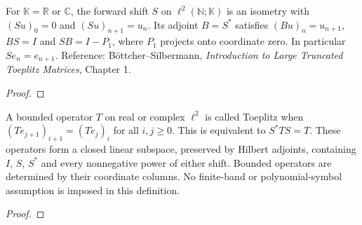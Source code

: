 \begin{supporting}
\begin{theorem}
\label{thm:toeplitz-shifts}
\leanok
For $\mathbb K=\mathbb R$ or $\mathbb C$, the forward shift $S$ on
$\ell^2(\mathbb N;\mathbb K)$ is an isometry with $(Su)_0=0$ and
$(Su)_{n+1}=u_n$. Its adjoint $B=S^*$ satisfies $(Bu)_n=u_{n+1}$,
$BS=I$ and $SB=I-P_1$, where $P_1$ projects onto coordinate zero.
In particular $Se_n=e_{n+1}$.
Reference: Böttcher--Silbermann, \emph{Introduction to Large Truncated
Toeplitz Matrices}, Chapter 1.
\end{theorem}
\begin{proof}
\leanok
\end{proof}

\end{supporting}


\begin{theorem}
\label{thm:toeplitz-bounded}
\leanok
A bounded operator $T$ on real or complex $\ell^2$ is called Toeplitz when
$(Te_{j+1})_{i+1}=(Te_j)_i$ for all $i,j\ge0$. This is equivalent to
$S^*TS=T$. These operators form a closed linear subspace, preserved by
Hilbert adjoints, containing $I$, $S$, $S^*$ and every nonnegative power
of either shift. Bounded operators are determined by their coordinate columns.
No finite-band or polynomial-symbol assumption is imposed in this definition.
\end{theorem}
\begin{proof}
\leanok
\end{proof}

